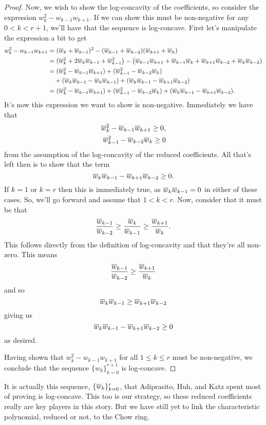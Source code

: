 \documentclass[12pt,oneside]{../../sfsuthesis}
\begin{document}
\begin{proof}
    Now, we wish to show the log-concavity of the coefficients, so consider the expression \( w_k^2 - w_{k-1}w_{k+1} \).
    If we can show this must be non-negative for any \( 0 < k < r+1 \), we'll have that the sequence is log-concave.
    First let's manipulate the expression a bit to get
    \begin{align*}
        w_k^2 - w_{k-1}w_{k+1} & = (\overline{w}_k + \overline{w}_{k-1})^2 - (\overline{w}_{k-1} + \overline{w}_{k-2})(\overline{w}_{k+1} + \overline{w}_{k})                                                                     \\
                               & = (\overline{w}_k^2 + 2\overline{w}_k \overline{w}_{k-1} + \overline{w}_{k-1}^2 \big) - \big( \overline{w}_{k-1} \overline{w}_{k+1} + \overline{w}_{k-1}\overline{w}_{k} + \overline{w}_{k+1}\overline{w}_{k-2} + \overline{w}_{k} \overline{w}_{k-2}) \\
                               & = (\overline{w}_k^2 - \overline{w}_{k-1}\overline{w}_{k+1}) + (\overline{w}_{k-1}^2 - \overline{w}_{k-2}\overline{w}_{k})                                                                        \\
                               & \quad + (\overline{w}_k \overline{w}_{k-1} - \overline{w}_k \overline{w}_{k-1}) + (\overline{w}_k \overline{w}_{k-1} - \overline{w}_{k+1} \overline{w}_{k-2} )                                                     \\
                               & = (\overline{w}_k^2 - \overline{w}_{k-1}\overline{w}_{k+1}) + (\overline{w}_{k-1}^2 - \overline{w}_{k-2}\overline{w}_{k}) + (\overline{w}_k \overline{w}_{k-1} - \overline{w}_{k+1} \overline{w}_{k-2} ).
    \end{align*}
    It's now this expression we want to show is non-negative.
    Immediately we have that
    \begin{align*}
        \overline{w}_k^2 - \overline{w}_{k-1}\overline{w}_{k+1} \geq 0, \\
        \overline{w}_{k-1}^2 - \overline{w}_{k-2}\overline{w}_{k} \geq 0
    \end{align*}
    from the assumption of the log-concavity of the reduced coefficients.
    All that's left then is to show that the term
    \[
        \overline{w}_k \overline{w}_{k-1} - \overline{w}_{k+1} \overline{w}_{k-2} \geq 0.
    \]
    If \( k = 1 \) or \( k = r \) then this is immediately true, as \(\overline{w}_k \overline{w}_{k-1} = 0\) in either of these cases.
    So, we'll go forward and assume that \( 1 < k < r \).
    Now, consider that it must be that
    \[
        \frac{\overline{w}_{k-1}}{\overline{w}_{k-2}} \geq \frac{\overline{w}_k}{\overline{w}_{k-1}} \geq \frac{\overline{w}_{k+1}}{\overline{w}_k}.
    \]
    This follows directly from the definition of log-concavity and that they're all non-zero.
    This means
    \[
        \frac{\overline{w}_{k-1}}{\overline{w}_{k-2}} \geq \frac{\overline{w}_{k+1}}{\overline{w}_k}
    \]
    and so
    \[
        \overline{w}_k \overline{w}_{k-1} \geq \overline{w}_{k+1} \overline{w}_{k-2}
    \]
    giving us
    \[
        \overline{w}_k \overline{w}_{k-1} - \overline{w}_{k+1} \overline{w}_{k-2} \geq 0
    \]
    as desired.

    Having shown that \( w_k^2 - w_{k-1}w_{k+1} \) for all \( 1 \leq k \leq r \) must be non-negative, we conclude that the sequence \( \{ w_k \}_{k=0}^{r+1} \) is log-concave.

\end{proof}
It is actually this sequence, \(\{\overline{w}_k\}_{k=0}^r \), that Adiprasito, Huh, and Katz spent most of \cite{adiprasitoHodgeTheoryCombinatorial2018} proving is log-concave.
This too is our strategy, so these reduced coefficients really are key players in this story.
But we have still yet to link the characteristic polynomial, reduced or not, to the Chow ring.
\end{document}

